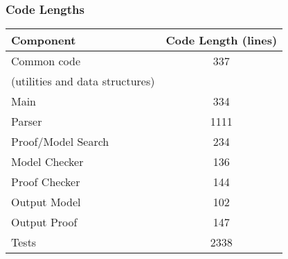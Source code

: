 \begin{frame}
  \frametitle{Code Lengths}
\begin{center}
  \begin{tabular}{|l|c|}
\hline
\textbf{Component} & \textbf{Code Length (lines)} \\
\hline
Common code & 337\\
(utilities and data structures) & \\
\hline
Main & 334\\
\hline
Parser & 1111\\
\hline
Proof/Model Search & 234\\
\hline
Model Checker & 136\\
\hline
Proof Checker & 144\\
\hline
Output Model & 102\\
\hline
Output Proof & 147\\
\hline
Tests & 2338\\
\hline
\end{tabular}
\end{center}
\end{frame}